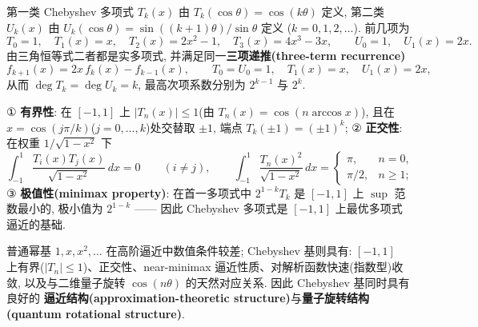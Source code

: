 \documentclass[utf8]{article} %
\numberwithin{equation}{section}   %
\newtheorem{Def}{\hskip 2em {\color{green} 定义}}[subsection]
\newtheorem{Note}{\hskip 2em {\color{red} 注}}[subsection]
\begin{document}
\begin{Def}
    第一类 Chebyshev 多项式 $T_k(x)$ 由 $T_k(\cos\theta) = \cos(k\theta)$ 定义,
    第二类 $U_k(x)$ 由 $U_k(\cos\theta) = \sin((k+1)\theta)/\sin\theta$ 定义
    ($k = 0, 1, 2, \dots$). 前几项为
    \begin{equation}
        T_0 = 1, \quad T_1(x) = x, \quad T_2(x) = 2x^2-1, \quad T_3(x) = 4x^3-3x,
        \qquad
        U_0 = 1, \quad U_1(x) = 2x.
    \end{equation}
    由三角恒等式二者都是实多项式, 并满足同一\textbf{三项递推(three-term recurrence)}
    \begin{equation}
        f_{k+1}(x) = 2x\, f_k(x) - f_{k-1}(x),
        \qquad
        T_0 = U_0 = 1, \quad T_1(x) = x, \quad U_1(x) = 2x,
    \end{equation}
    从而 $\deg T_k = \deg U_k = k$, 最高次项系数分别为 $2^{k-1}$ 与 $2^k$.
\end{Def}

\begin{Note}
    ① \textbf{有界性}: 在 $[-1,1]$ 上 $|T_n(x)| \le 1$(由 $T_n(x) = \cos(n\arccos x)$),
    且在 $x = \cos(j\pi/k)$($j = 0, \dots, k$)处交替取 $\pm 1$, 端点 $T_k(\pm 1) = (\pm 1)^k$;
    ② \textbf{正交性}: 在权重 $1/\sqrt{1-x^2}$ 下
    \begin{equation}
        \int_{-1}^{1} \frac{T_i(x)T_j(x)}{\sqrt{1-x^2}}\,dx = 0 \qquad (i \ne j),
        \qquad
        \int_{-1}^{1} \frac{T_n(x)^2}{\sqrt{1-x^2}}\,dx =
        \begin{cases} \pi, & n = 0, \\ \pi/2, & n \ge 1; \end{cases}
    \end{equation}
    ③ \textbf{极值性(minimax property)}: 在首一多项式中 $2^{1-k}T_k$ 是
    $[-1,1]$ 上 $\sup$ 范数最小的, 极小值为 $2^{1-k}$ —— 因此 Chebyshev 多项式是
    $[-1,1]$ 上最优多项式逼近的基础.
\end{Note}

\begin{Note}
    普通幂基 $1, x, x^2, \dots$ 在高阶逼近中数值条件较差; Chebyshev 基则具有:
    $[-1,1]$ 上有界($|T_n| \le 1$)、正交性、near-minimax 逼近性质、对解析函数快速(指数型)收敛,
    以及与二维量子旋转 $\cos(n\theta)$ 的天然对应关系. 因此 Chebyshev 基同时具有良好的
    \textbf{逼近结构(approximation-theoretic structure)}与\textbf{量子旋转结构(quantum rotational structure)}.
\end{Note}
\end{document}
